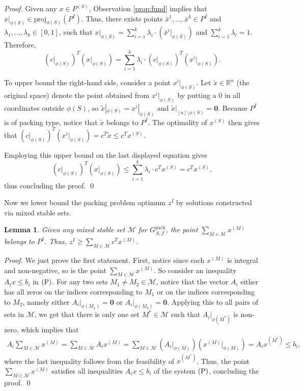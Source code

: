 \documentclass[smallextended]{svjour3}
\newtheorem{lemma}[proposition]{Lemma}
\begin{document}
	\begin{proof}
		Given any $x \in P^{(S)}$, Observation \ref{prop:fund} implies that $x|_{\phi(S)} \in {\mathrm{proj}}_{\phi(S)}(P^I)$. Thus, there exists points $\bar{x}^1,\ldots,\bar{x}^k \in P^I$ and $\lambda_1,\ldots, \lambda_k \in [0, 1]$, such that $x|_{\phi(S)} = \sum_{i = 1}^k \lambda_i \cdot (\bar{x}^i|_{\phi(S)})$ and $\sum _{i= 1}^k \lambda_i = 1$. Therefore, $$({c}|_{\phi(S)})^T (x|_{\phi(S)}) = \sum_{i = 1}^k \lambda_i \cdot (c|_{\phi(S)})^T (x^i|_{\phi(S)}).$$

			To upper bound the right-hand side, consider a point $x^i|_{\phi(S)}$. Let $\tilde{x} \in {\mathbb{R}}^n$ (the original space) denote the point obtained from $x^i|_{\phi(S)}$ by putting a 0 in all coordinates outside $\phi(S)$, so $\tilde{x}|_{\phi(S)} = x^i|_{\phi(S)}$ and $\tilde{x}|_{[n] \setminus \phi(S)} = \mathbf{0}$. Because $P^I$ is of packing type, notice that $\tilde{x}$ belongs to $P^I$. The optimality of $x^{(S)}$ then gives that $(c|_{\phi(S)})^T (x^i|_{\phi(S)}) = c^T \tilde{x} \le c^T x^{(S)}$.
		
		Employing this upper bound on the last displayed equation gives  $$({c}|_{\phi(S)})^T (x|_{\phi(S)}) \le \sum_{i = 1}^k \lambda_i \cdot c^T x^{(S)} = c^T x^{(S)},$$ thus concluding the proof. {
\ifmp
	\hfill \qed
\fi
}
	\end{proof}
	
	Now we lower bound the packing problem optimum $z^I$ by solutions constructed via mixed stable sets.
	
\begin{lemma}\label{lem:addstableset}
Given any mixed stable set $\mathcal{M}$ for ${G^{\textrm{pack}}_{A, {\mathcal{J}}}}$, the point $\sum_{M \in {\mathcal{M}}} x^{(M)}$ belongs to $P^I$. Thus, $z^I \ge \sum_{M \in \mathcal{M}} c^T x^{(M)}$.
\end{lemma}

\begin{proof}
	We just prove the first statement. First, notice since each $x^{(M)}$ is integral and non-negative, so is the point $\sum_{M \in {\mathcal{M}}} x^{(M)}$. So consider an inequality $A_i x \le b_i$ in $(\textup{P})$. For any two sets $M_1 \neq M_2 \in {\mathcal{M}}$, notice that the vector $A_i$ either has all zeros on the indices corresponding to $M_1$ or on the indices corresponding to $M_2$, namely either $A_i|_{\phi(M_1)} = \textbf{0}$ or $A_i|_{\phi(M_2)} = \textbf{0}$. Applying this to all pairs of sets in ${\mathcal{M}}$, we get that there is only one set $M^* \in {\mathcal{M}}$ such that $A_i|_{\phi(M^*)}$ is non-zero, which implies that 
		\begin{align*}
		A_i \sum_{M \in {\mathcal{M}}} x^{(M)} = \sum_{M \in {\mathcal{M}}} A_i x^{(M)} = \sum_{M \in {\mathcal{M}}} (A_i|_{\phi(M)}) (x^{(M)}|_{\phi(M)}) = A_i x^{(M^*)} \le b_i,
	\end{align*}
	where the last inequality follows from the feasibility of $x^{(M^*)}$. Thus, the point $\sum_{M \in {\mathcal{M}}} x^{(M)}$ satisfies all inequalities $A_i x \le b_i$ of the system $(\textup{P})$, concluding the proof. {
\ifmp
	\hfill \qed
\fi
}
	
\end{proof}
	
\end{document}
